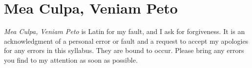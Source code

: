 \documentclass[letterpaper]{inzane_syllabus} %
\begin{document}
\bigskip
\section{Mea Culpa, Veniam Peto}

\textit{Mea Culpa, Veniam Peto} is Latin for my fault, and I ask for forgiveness. It is an acknowledgment of a personal error or fault and a request to accept my apologies for any errors in this syllabus. They are bound to occur. Please bring any errors you find to my attention as soon as possible.
\end{document}
